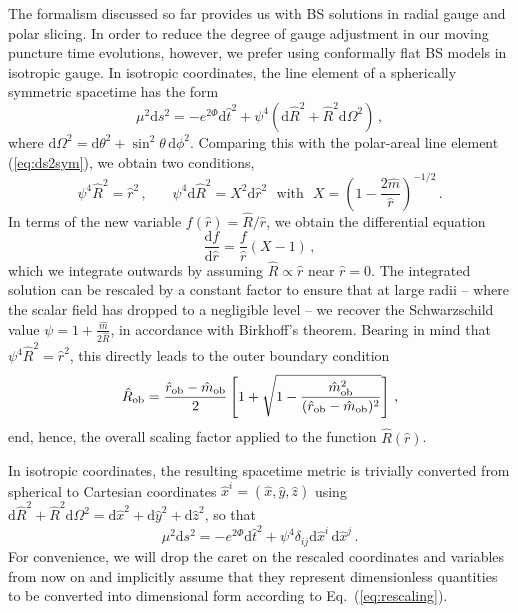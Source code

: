 \documentclass[]{iopart}
\newcommand{\du}{\mathrm{d}}
\begin{document}
The formalism discussed so far provides us with BS solutions in
radial gauge and polar slicing.  In order to reduce the degree of
gauge adjustment in our moving puncture time evolutions, however,
we prefer using conformally flat BS models in isotropic gauge. In
isotropic coordinates, the line element of a spherically symmetric
spacetime has the form
%
\begin{equation}
  \mu^2 \du s^2 = -e^{2\Phi}\du \hat{t}^2+\psi^4 (\du \hat{R}^2
        + \hat{R}^2\du \Omega^2)\,,
  \label{eq:ds2iso}
\end{equation}
%
where $\du \Omega^2=\du\theta^2+\sin^2\theta\,\du \phi^2$. Comparing
this with the polar-areal line element (\ref{eq:ds2sym}), we obtain
two conditions,
%
\begin{equation}
  \psi^4 \hat{R}^2 = \hat{r}^2\,,~~~~~~~~
  \psi^4\du \hat{R}^2=
  X^2 \du \hat{r}^2~~~\text{with}~~~
  X=\left(1-\frac{2\hat{m}}{\hat{r}}\right)^{-1/2}\,.
\end{equation}
%
In terms of the new variable $f(\hat{r})=\hat{R}/\hat{r}$, we obtain
the differential equation
%
\begin{equation}
  \frac{\du f}{\du \hat{r}} = \frac{f}{\hat{r}}(X-1)\,,
\end{equation}
%
which we integrate outwards by assuming $\hat{R}\propto \hat{r}$
near $\hat{r}=0$. The integrated solution can be rescaled by a
constant factor to ensure that at large radii -- where the scalar
field has dropped to a negligible level -- we recover the Schwarzschild
value $\psi = 1+\frac{\hat{m}}{2\hat{R}}$, in accordance with
Birkhoff's theorem.  Bearing in mind that $\psi^4\hat{R}^2=\hat{r}^2$,
this directly leads to the outer boundary condition
%
\begin{equation}
  \hat{R}_{\rm ob} =
  \frac{\hat{r}_{\rm ob}-\hat{m}_{\rm ob}}{2}
  \left[
  1+
  \sqrt{1-\frac{\hat{m}_{\rm ob}^2}{(\hat{r}_{\rm ob}-\hat{m}_{\rm ob})^2}}
  \right]\,,
\end{equation}
%
end, hence, the overall scaling factor applied to the function
$\hat{R}(\hat{r})$.

In isotropic coordinates, the resulting spacetime metric is trivially
converted from spherical to Cartesian coordinates
$\hat{x}^i=(\hat{x},\hat{y},\hat{z})$ using $\du \hat{R}^2 +
\hat{R}^2\du \Omega^2=\du \hat{x}^2+\du \hat{y}^2+\du \hat{z}^2$,
so that
%
\begin{equation}
  \mu^2 \du s^2 = -e^{2\Phi} \du \hat{t}^2 + \psi^4 \delta_{ij}
        \du \hat{x}^i \,\du \hat{x}^j \,.
\end{equation}
%
For convenience, we will drop the caret on the rescaled coordinates
and variables from now on and implicitly assume that they represent
dimensionless quantities to be converted into dimensional form
according to Eq.~(\ref{eq:rescaling}).
\end{document}
